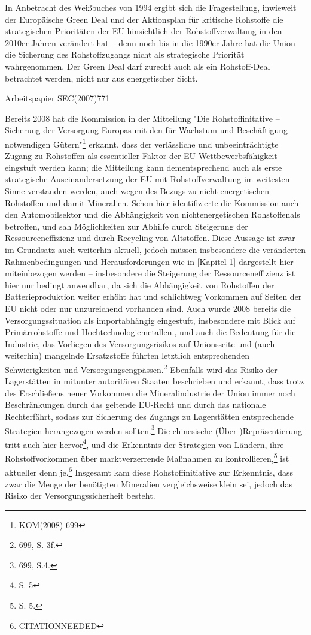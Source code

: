 \documentclass[12pt,a4paper,oneside]{book} %
\begin{document}
In Anbetracht des Weißbuches von 1994 ergibt sich die Fragestellung, inwieweit der Europäische Green Deal und der Aktionsplan für kritische Rohstoffe die strategischen Prioritäten der EU hinsichtlich der Rohstoffverwaltung in den 2010er-Jahren verändert hat -- denn noch bis in die 1990er-Jahre hat die Union die Sicherung des Rohstoffzugangs nicht als strategische Priorität wahrgenommen\autocite[7]{Kueblboeck_2023}. Der Green Deal darf zurecht auch als ein Rohstoff-Deal betrachtet werden, nicht nur aus energetischer Sicht.\autocite{ZRP 2023, 207}
	
Arbeitspapier SEC(2007)771
	
Bereits 2008 hat die Kommission in der Mitteilung "Die Rohstoffinitative -- Sicherung der Versorgung Europas mit den für Wachstum und Beschäftigung notwendigen Gütern"\footnote{KOM(2008) 699} erkannt, dass der verlässliche und unbeeinträchtigte Zugang zu Rohstoffen als essentieller Faktor der EU-Wettbewerbsfähigkeit eingstuft werden kann; die Mitteilung kann dementsprechend auch als erste strategische Auseinandersetzung der EU mit Rohstoffverwaltung im weitesten Sinne verstanden werden, auch wegen des Bezugs zu nicht-energetischen Rohstoffen und damit Mineralien. Schon hier identifizierte die Kommission auch den Automobilsektor und die Abhängigkeit von \glqq nichtenergetischen Rohstoffen\grqq als betroffen, und sah Möglichkeiten zur Abhilfe \glqq durch Steigerung der Ressourceneffizienz und durch Recycling von Altstoffen\grqq. Diese Aussage ist zwar im Grundsatz auch weiterhin aktuell, jedoch müssen insbesondere die veränderten Rahmenbedingungen und Herausforderungen wie in \ref{Kapitel 1} dargestellt hier miteinbezogen werden -- insbesondere die Steigerung der Ressourceneffizienz ist hier nur bedingt anwendbar, da sich die Abhängigkeit von Rohstoffen der Batterieproduktion weiter erhöht hat und schlichtweg Vorkommen auf Seiten der EU nicht oder nur unzureichend vorhanden sind. Auch wurde 2008 bereits die Versorgungssituation als importabhängig eingestuft, insbesondere mit Blick auf Primärrohstoffe und \glqq Hochtechnologiemetallen\grqq., und auch die Bedeutung für die Industrie, das Vorliegen des Versorgungsrisikos auf Unionsseite und (auch weiterhin) mangelnde Ersatzstoffe führten letztlich entsprechenden Schwierigkeiten und Versorgungsengpässen.\footnote{699, S. 3f.} Ebenfalls wird das Risiko der Lagerstätten in mitunter autoritären Staaten beschrieben und erkannt, dass trotz des Erschließens neuer Vorkommen die Mineralindustrie der Union \glqq immer noch Beschränkungen durch das geltende EU-Recht und durch das nationale Recht\grqq erfährt, sodass zur Sicherung des Zugangs zu Lagerstätten entsprechende Strategien herangezogen werden sollten.\footnote{699, S.4.} Die chinesische (Über-)Repräsentierung tritt auch hier hervor\footnote{S. 5}, und die Erkenntnis der Strategien von Ländern, ihre Rohstoffvorkommen über marktverzerrende Maßnahmen zu kontrollieren,\footnote{S. 5.} ist aktueller denn je.\footnote{CITATIONNEEDED} Insgesamt kam diese Rohstoffinitiative zur Erkenntnis, dass zwar die Menge der benötigten Mineralien vergleichsweise klein sei, jedoch das Risiko der Versorgungssicherheit besteht.
\end{document}
